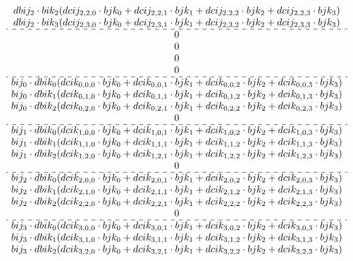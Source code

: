 \documentclass[12pt]{article}
\begin{document}
{$${\begin{array}{c}
dbij_2 \cdot bik_2 (dcij_{2,2,0} \cdot bjk_0 + dcij_{2,2,1} \cdot bjk_1 + dcij_{2,2,2} \cdot bjk_2 + dcij_{2,2,3} \cdot bjk_3)\\
dbij_2 \cdot bik_3 (dcij_{2,3,0} \cdot bjk_0 + dcij_{2,3,1} \cdot bjk_1 + dcij_{2,3,2} \cdot bjk_2 + dcij_{2,3,3} \cdot bjk_3)\\
\hdashline
0 \\
0 \\
0 \\
0 \\
\hdashline
bij_0 \cdot dbik_0 (dcik_{0,0,0} \cdot bjk_0 + dcik_{0,0,1} \cdot bjk_1 + dcik_{0,0,2} \cdot bjk_2 + dcik_{0,0,3} \cdot bjk_3)\\
bij_0 \cdot dbik_1 (dcik_{0,1,0} \cdot bjk_0 + dcik_{0,1,1} \cdot bjk_1 + dcik_{0,1,2} \cdot bjk_2 + dcik_{0,1,3} \cdot bjk_3)\\
bij_0 \cdot dbik_2 (dcik_{0,2,0} \cdot bjk_0 + dcik_{0,2,1} \cdot bjk_1 + dcik_{0,2,2} \cdot bjk_2 + dcik_{0,2,3} \cdot bjk_3)\\
0 \\
\hdashline
bij_1 \cdot dbik_0 (dcik_{1,0,0} \cdot bjk_0 + dcik_{1,0,1} \cdot bjk_1 + dcik_{1,0,2} \cdot bjk_2 + dcik_{1,0,3} \cdot bjk_3)\\
bij_1 \cdot dbik_1 (dcik_{1,1,0} \cdot bjk_0 + dcik_{1,1,1} \cdot bjk_1 + dcik_{1,1,2} \cdot bjk_2 + dcik_{1,1,3} \cdot bjk_3)\\
bij_1 \cdot dbik_2 (dcik_{1,2,0} \cdot bjk_0 + dcik_{1,2,1} \cdot bjk_1 + dcik_{1,2,2} \cdot bjk_2 + dcik_{1,2,3} \cdot bjk_3)\\
0 \\
\hdashline
bij_2 \cdot dbik_0 (dcik_{2,0,0} \cdot bjk_0 + dcik_{2,0,1} \cdot bjk_1 + dcik_{2,0,2} \cdot bjk_2 + dcik_{2,0,3} \cdot bjk_3)\\
bij_2 \cdot dbik_1 (dcik_{2,1,0} \cdot bjk_0 + dcik_{2,1,1} \cdot bjk_1 + dcik_{2,1,2} \cdot bjk_2 + dcik_{2,1,3} \cdot bjk_3)\\
bij_2 \cdot dbik_2 (dcik_{2,2,0} \cdot bjk_0 + dcik_{2,2,1} \cdot bjk_1 + dcik_{2,2,2} \cdot bjk_2 + dcik_{2,2,3} \cdot bjk_3)\\
0 \\
\hdashline
bij_3 \cdot dbik_0 (dcik_{3,0,0} \cdot bjk_0 + dcik_{3,0,1} \cdot bjk_1 + dcik_{3,0,2} \cdot bjk_2 + dcik_{3,0,3} \cdot bjk_3)\\
bij_3 \cdot dbik_1 (dcik_{3,1,0} \cdot bjk_0 + dcik_{3,1,1} \cdot bjk_1 + dcik_{3,1,2} \cdot bjk_2 + dcik_{3,1,3} \cdot bjk_3)\\
bij_3 \cdot dbik_2 (dcik_{3,2,0} \cdot bjk_0 + dcik_{3,2,1} \cdot bjk_1 + dcik_{3,2,2} \cdot bjk_2 + dcik_{3,2,3} \cdot bjk_3)\\

\end{array}}$$}
\end{document}

